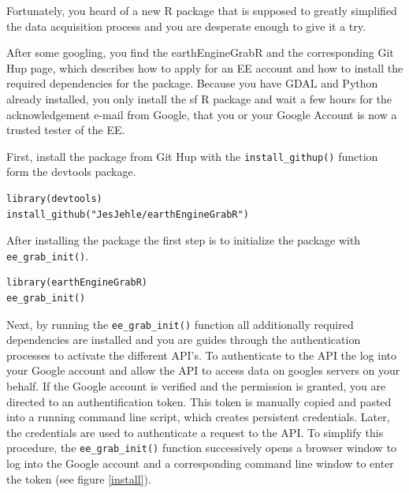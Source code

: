 Fortunately, you heard of a new R package that is supposed to greatly simplified the data acquisition process and you are desperate enough to give it a try. 

After some googling, you find the earthEngineGrabR and the corresponding Git Hup page, which describes how to apply for an EE account and how to install the required dependencies for the package. Because you have GDAL and Python already installed, you only install the sf R package and wait a few hours for the acknowledgement e-mail from Google, that you or your Google Account is now a trusted tester of the EE.

First, install the package from Git Hup with the \texttt{install\_githup()} function form the devtools package.

\begin{lstlisting}
library(devtools)
install_github("JesJehle/earthEngineGrabR")
\end{lstlisting}

After installing the package the first step is to initialize the package with \texttt{ee\_grab\_init()}. 

\begin{lstlisting}
library(earthEngineGrabR)
ee_grab_init()
\end{lstlisting}

Next, by running the \texttt{ee\_grab\_init()} function all additionally required dependencies are installed and you are guides through the authentication processes to activate the different API's. To authenticate to the API the log into your Google account and allow the API to access data on googles servers on your behalf. 
If the Google account is verified and the permission is granted, you are directed to an authentification token. This token is manually copied and pasted into a running command line script, which creates persistent credentials. Later, the credentials are used to authenticate a request to the API. To simplify this procedure, the \texttt{ee\_grab\_init()} function successively opens a browser window to log into the Google account and a corresponding command line window to enter the token (see figure \ref{install}). 

